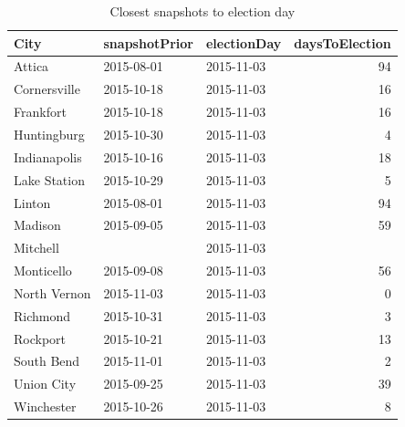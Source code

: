 \documentclass[11pt]{article}
\begin{document}

\begin{table}[ht]
	\centering
	\begin{tabular}{lllr}
		\hline
		City & snapshotPrior & electionDay & daysToElection \\ 
		\hline
		Attica & 2015-08-01 & 2015-11-03 & 94 \\ 
		Cornersville & 2015-10-18 & 2015-11-03 & 16 \\ 
		Frankfort & 2015-10-18 & 2015-11-03 & 16 \\ 
		Huntingburg & 2015-10-30 & 2015-11-03 & 4 \\ 
		Indianapolis & 2015-10-16 & 2015-11-03 & 18 \\ 
		Lake Station & 2015-10-29 & 2015-11-03 & 5 \\ 
		Linton & 2015-08-01 & 2015-11-03 & 94 \\ 
		Madison & 2015-09-05 & 2015-11-03 & 59 \\ 
		Mitchell &  & 2015-11-03 &  \\ 
		Monticello & 2015-09-08 & 2015-11-03 & 56 \\ 
		North Vernon & 2015-11-03 & 2015-11-03 & 0 \\ 
		Richmond & 2015-10-31 & 2015-11-03 & 3 \\ 
		Rockport & 2015-10-21 & 2015-11-03 & 13 \\ 
		South Bend & 2015-11-01 & 2015-11-03 & 2 \\ 
		Union City & 2015-09-25 & 2015-11-03 & 39 \\ 
		Winchester & 2015-10-26 & 2015-11-03 & 8 \\ 
		\hline
	\end{tabular}
	\caption{Closest snapshots to election day} 
\end{table}
\end{document}
